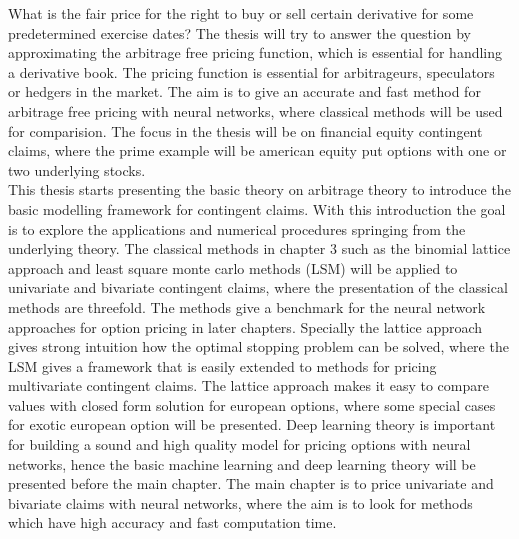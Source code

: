 What is the fair price for the right to buy or sell certain derivative for some predetermined exercise dates? The thesis will try to answer the question by approximating the arbitrage free pricing function, which is essential for handling a derivative book. The pricing function is essential for arbitrageurs, speculators or hedgers in the market. The aim is to give an accurate and fast method for arbitrage free pricing with neural networks, where classical methods will be used for comparision. The focus in the thesis will be on financial equity contingent claims, where the prime example will be american equity put options with one or two underlying stocks.\\

This thesis starts presenting the basic theory on arbitrage theory to introduce the basic modelling framework for contingent claims. With this introduction the goal is to explore the applications and numerical procedures springing from the underlying theory. The classical methods in chapter 3 such as the binomial lattice approach and least square monte carlo methods (LSM) will be applied to univariate and bivariate contingent claims, where the presentation of the classical methods are threefold. The methods give a benchmark for the neural network approaches for option pricing in later chapters. Specially the lattice approach gives strong intuition how the optimal stopping problem can be solved, where the LSM gives a framework that is easily extended to methods for pricing multivariate contingent claims. The lattice approach makes it easy to compare values with closed form solution for european options, where some special cases for exotic european option will be presented. Deep learning theory is important for building a sound and high quality model for pricing options with neural networks, hence the basic machine learning and deep learning theory will be presented before the main chapter. The main chapter is to price univariate and bivariate claims with neural networks, where the aim is to look for methods which have high accuracy and fast computation time. 


